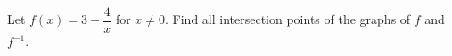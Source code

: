 Let $f(x)=3+\dfrac{4}{x}$ for $x\ne0$. Find all intersection points of the graphs of $f$ and $f^{-1}$.

